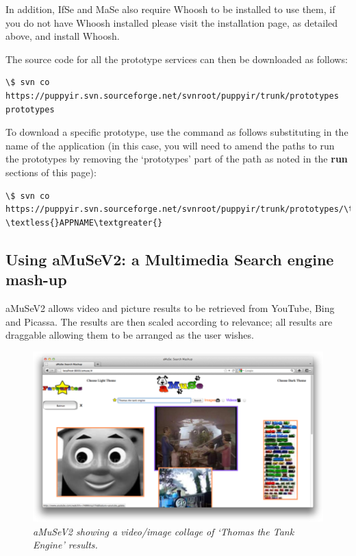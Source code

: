 \documentclass[letterpaper,10pt,english]{sphinxmanual}
\begin{document}
In addition, IfSe and MaSe also require Whoosh to be installed to use them, if you do not have Whoosh installed please visit the installation page, as detailed above, and install Whoosh.

The source code for all the prototype services can then be downloaded as follows:

\begin{Verbatim}[commandchars=\\\{\}]
\$ svn co https://puppyir.svn.sourceforge.net/svnroot/puppyir/trunk/prototypes prototypes
\end{Verbatim}

To download a specific prototype, use the command as follows substituting in the name of the application (in this case, you will need to amend the paths to run the prototypes by removing the `prototypes' part of the path as noted in the \textbf{run} sections of this page):

\begin{Verbatim}[commandchars=\\\{\}]
\$ svn co https://puppyir.svn.sourceforge.net/svnroot/puppyir/trunk/prototypes/\textless{}APPNAME\textgreater{} \textless{}APPNAME\textgreater{}
\end{Verbatim}


\subsection{Using aMuSeV2: a Multimedia Search engine mash-up}
\label{prototypes:using-amusev2-a-multimedia-search-engine-mash-up}
aMuSeV2 allows video and picture results to be retrieved from YouTube, Bing and Picassa. The results are then scaled according to relevance; all results are draggable allowing them to be arranged as the user wishes.
\begin{figure}[htbp]
\centering
\capstart

\includegraphics{puppy-amuse.png}
\caption{\emph{aMuSeV2 showing a video/image collage of `Thomas the Tank Engine' results.}}\end{figure}
\end{document}
